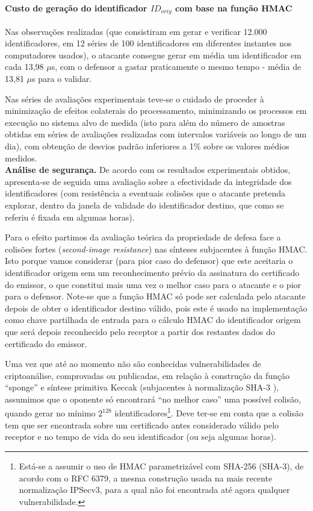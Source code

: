 \paragraph{\textbf{Custo de geração do identificador $ID_{orig}$ com base na função HMAC}}
Nas observações realizadas (que consistiram em gerar e verificar 12.000 identificadores, em 12 séries de 100
identificadores em diferentes instantes nos computadores usados), o atacante
consegue gerar em média um identificador em cada 13,98 $\mu $s, com o defensor a gastar
praticamente o mesmo tempo - média de 13,81 $\mu $s para o validar.

Nas séries de avaliações experimentais teve-se o cuidado de proceder à minimização de efeitos colaterais do processamento, minimizando os processos em execução no sistema alvo de medida (isto para além do número de amostras obtidas em séries de avaliações realizadas com intervalos variáveis ao longo de um dia), com obtenção de desvios padrão inferiores a 1\% sobre os valores médios medidos.
\\

\noindent
\textbf{Análise de segurança.}
De acordo com os resultados experimentais obtidos,
apresenta-se de seguida uma avaliação sobre a efectividade da integridade dos identificadores (com resistência a eventuais
colisões que o atacante pretenda explorar, dentro da janela de validade do identificador destino, que como se referiu é fixada em
algumas horas).

Para o efeito partimos da avaliação teórica da propriedade de defesa face a colisões fortes (\emph{second-image resistance})
nas sínteses subjacentes à função HMAC. Isto porque vamos considerar (para pior caso do defensor) que este aceitaria o
identificador origem sem um reconhecimento prévio da assinatura do certificado do emissor, o que constitui mais uma vez o melhor caso
para o atacante e o pior para o defensor. Note-se que a função HMAC só pode  ser calculada pelo atacante depois de obter o identificador
destino válido, pois este é usado na implementação como chave partilhada de entrada para o cálculo HMAC
do identificador origem que será depois reconhecido pelo receptor a partir dos restantes dados do certificado do emissor.

Uma vez que até ao momento não são conhecidas vulnerabilidades de criptoanálise, comprovadas ou publicadas, em relação
à construção da função ``sponge'' e síntese primitiva Keccak (subjacentes à normalização SHA-3 \cite{sha3}),
assumimos que o oponente só encontrará ``no melhor caso'' uma possível colisão, quando gerar no mínimo
$2^{128}$ identificadores\footnote{Está-se a assumir o uso de HMAC parametrizável com SHA-256 (SHA-3),
de acordo com o RFC 6379,
a mesma construção usada na mais recente normalização IPSecv3, para a qual não foi
encontrada até agora qualquer vulnerabilidade.}.
Deve ter-se em conta que a colisão tem que ser encontrada sobre
um certificado antes considerado válido pelo receptor e no tempo de vida do seu identificador (ou seja algumas horas).

